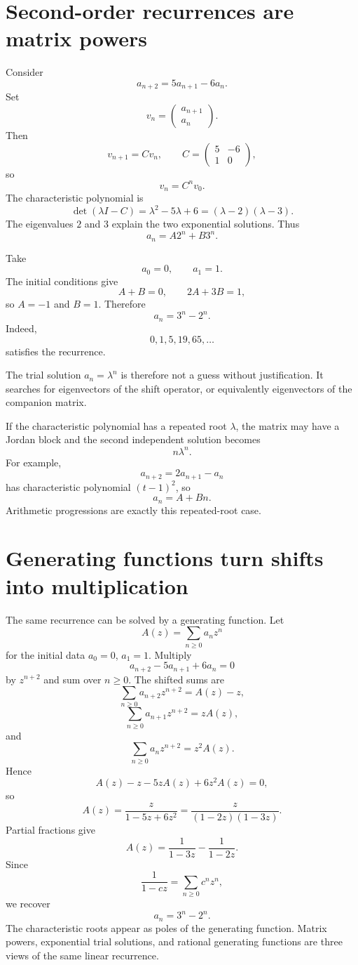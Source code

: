 \section{Second-order recurrences are matrix powers}

Consider
\[
  a_{n+2}=5a_{n+1}-6a_n.
\]
Set
\[
  v_n=
  \begin{pmatrix}a_{n+1}\\a_n\end{pmatrix}.
\]
Then
\[
  v_{n+1}=Cv_n,
  \qquad
  C=
  \begin{pmatrix}5&-6\\1&0\end{pmatrix},
\]
so
\[
  v_n=C^n v_0.
\]
The characteristic polynomial is
\[
  \det(\lambda I-C)
  =\lambda^2-5\lambda+6
  =(\lambda-2)(\lambda-3).
\]
The eigenvalues \(2\) and \(3\) explain the two exponential solutions.  Thus
\[
  a_n=A2^n+B3^n.
\]

Take
\[
  a_0=0,
  \qquad
  a_1=1.
\]
The initial conditions give
\[
  A+B=0,
  \qquad
  2A+3B=1,
\]
so \(A=-1\) and \(B=1\).  Therefore
\[
  \boxed{a_n=3^n-2^n.}
\]
Indeed,
\[
  0,1,5,19,65,\ldots
\]
satisfies the recurrence.

The trial solution \(a_n=\lambda^n\) is therefore not a guess without justification.  It searches for eigenvectors of the shift operator, or equivalently eigenvectors of the companion matrix.

If the characteristic polynomial has a repeated root \(\lambda\), the matrix may have a Jordan block and the second independent solution becomes
\[
  n\lambda^n.
\]
For example,
\[
  a_{n+2}=2a_{n+1}-a_n
\]
has characteristic polynomial \((t-1)^2\), so
\[
  a_n=A+Bn.
\]
Arithmetic progressions are exactly this repeated-root case.

\section{Generating functions turn shifts into multiplication}

The same recurrence can be solved by a generating function.  Let
\[
  A(z)=\sum_{n\geq0}a_nz^n
\]
for the initial data \(a_0=0\), \(a_1=1\).  Multiply
\[
  a_{n+2}-5a_{n+1}+6a_n=0
\]
by \(z^{n+2}\) and sum over \(n\geq0\).  The shifted sums are
\[
  \sum_{n\geq0}a_{n+2}z^{n+2}=A(z)-z,
\]
\[
  \sum_{n\geq0}a_{n+1}z^{n+2}=zA(z),
\]
and
\[
  \sum_{n\geq0}a_nz^{n+2}=z^2A(z).
\]
Hence
\[
  A(z)-z-5zA(z)+6z^2A(z)=0,
\]
so
\[
  A(z)=\frac{z}{1-5z+6z^2}
      =\frac{z}{(1-2z)(1-3z)}.
\]
Partial fractions give
\[
  A(z)=\frac1{1-3z}-\frac1{1-2z}.
\]
Since
\[
  \frac1{1-cz}=\sum_{n\geq0}c^nz^n,
\]
we recover
\[
  a_n=3^n-2^n.
\]
The characteristic roots appear as poles of the generating function.  Matrix powers, exponential trial solutions, and rational generating functions are three views of the same linear recurrence.

